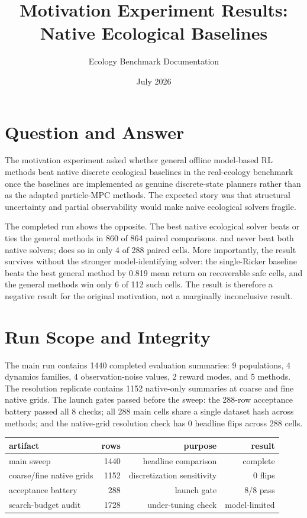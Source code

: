 \documentclass[11pt]{article}
\title{Motivation Experiment Results: Native Ecological Baselines}
\author{Ecology Benchmark Documentation}
\date{July 2026}
\begin{document}
\maketitle

\section{Question and Answer}

The motivation experiment asked whether general offline model-based RL methods
beat native discrete ecological baselines in the real-ecology benchmark once
the baselines are implemented as genuine discrete-state planners rather than as
the adapted particle-MPC methods. The expected story was that structural
uncertainty and partial observability would make naive ecological solvers
fragile.

The completed run shows the opposite. The best native ecological solver beats
or ties the general methods in 860 of 864 paired comparisons. 
and  never beat both native solvers;  does so in only
4 of 288 paired cells. More importantly, the result survives without the
stronger  model-identifying solver: the single-Ricker
 baseline beats the best general method by 0.819 mean return
on recoverable safe cells, and the general methods win only 6 of 112 such
cells. The result is therefore a negative result for the original motivation,
not a marginally inconclusive result.

\section{Run Scope and Integrity}

The main run contains 1440 completed evaluation summaries:
9 populations, 4 dynamics families, 4 observation-noise values, 2 reward modes,
and 5 methods. The resolution replicate contains 1152 native-only summaries
at coarse and fine native grids. The launch gates passed before the sweep:
the 288-row acceptance battery passed all 8 checks; all 288 main cells share a
single dataset hash across methods; and the native-grid resolution check has
0 headline flips across 288 cells.

\begin{center}
\begin{tabular}{lrrr}
\toprule
artifact & rows & purpose & result \\
\midrule
main sweep & 1440 & headline comparison & complete \\
coarse/fine native grids & 1152 & discretization sensitivity & 0 flips \\
acceptance battery & 288 & launch gate & 8/8 pass \\
search-budget audit & 1728 & under-tuning check & model-limited \\
\bottomrule
\end{tabular}
\end{center}
\end{document}
